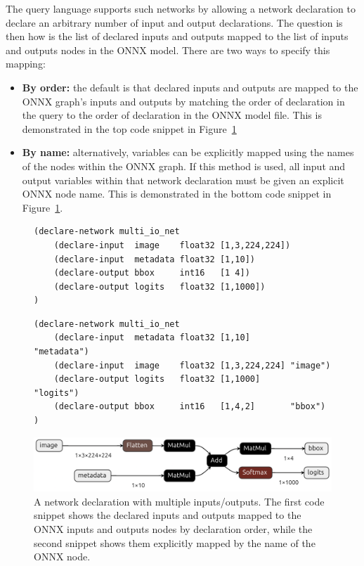 The query language supports such networks by allowing a network declaration to declare an arbitrary number of input and output declarations. The question is then how is the list of declared inputs and outputs mapped to the list of inputs and outputs nodes in the ONNX model. There are two ways to specify this mapping: 
\begin{itemize}
    \item \textbf{By order:} the default is that declared inputs and outputs are mapped to the ONNX graph's inputs and outputs by matching the order of declaration in the query to the order of declaration in the ONNX model file. This is demonstrated in the top code snippet in Figure~\ref{fig:multi-inputs-outputs}
    \item \textbf{By name:} alternatively, variables can be explicitly mapped using the names of the nodes within the ONNX graph. If this method is used, all input and output variables within that network declaration must be given an explicit ONNX node name. This is demonstrated in the bottom code snippet in Figure~\ref{fig:multi-inputs-outputs}.
\end{itemize}

\begin{figure}[h!]
    \centering
    \begin{lstlisting}[style=lbnf]
(declare-network multi_io_net
    (declare-input  image    float32 [1,3,224,224])
    (declare-input  metadata float32 [1,10])
    (declare-output bbox     int16   [1 4])
    (declare-output logits   float32 [1,1000])
)\end{lstlisting}

    \begin{lstlisting}[style=lbnf]
(declare-network multi_io_net
    (declare-input  metadata float32 [1,10]        "metadata")
    (declare-input  image    float32 [1,3,224,224] "image")
    (declare-output logits   float32 [1,1000]      "logits")
    (declare-output bbox     int16   [1,4,2]       "bbox")
)\end{lstlisting}

    \vspace{0.5cm}
    \includegraphics[width=\textwidth]{imgs/multi_io_net.onnx.png}
    \caption{A \vnnlib{} network declaration with multiple inputs/outputs. The first code snippet shows the declared inputs and outputs mapped to the ONNX inputs and outputs nodes by declaration order, while the second snippet shows them explicitly mapped by the name of the ONNX node.}
    \label{fig:multi-inputs-outputs}
\end{figure}


